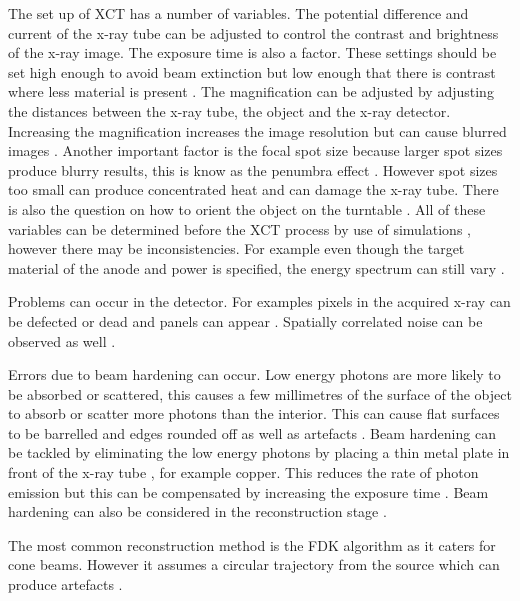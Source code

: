 The set up of XCT has a number of variables. The potential difference and current of the x-ray tube can be adjusted to control the contrast and brightness of the x-ray image. The exposure time is also a factor. These settings should be set high enough to avoid beam extinction but low enough that there is contrast where less material is present \citep{kruth2011computed}. The magnification can be adjusted by adjusting the distances between the x-ray tube, the object and the x-ray detector. Increasing the magnification increases the image resolution but can cause blurred images \citep{kruth2011computed}. Another important factor is the focal spot size because larger spot sizes produce blurry results, this is know as the penumbra effect \citep{kueh2016modelling}. However spot sizes too small can produce concentrated heat \citep{welkenhuyzen2009industrial} and can damage the x-ray tube. There is also the question on how to orient the object on the turntable \citep{corcoran2016observations}. All of these variables can be determined before the XCT process by use of simulations \citep{reisinger2011simulation, reiter2011simulation}, however there may be inconsistencies. For example even though the target material of the anode and power is specified, the energy spectrum can still vary \citep{stumbo2004direct}.

Problems can occur in the detector. For examples pixels in the acquired x-ray can be defected or dead \citep{brettschneider2014spatial} and panels can appear \citep{yang2009evaluation}. Spatially correlated noise can be observed as well \citep{sun2016characterisation}.

Errors due to beam hardening can occur. Low energy photons are more likely to be absorbed or scattered, this causes a few millimetres of the surface of the object to absorb or scatter more photons than the interior. This can cause flat surfaces to be barrelled and edges rounded off \citep{kruth2011computed} as well as artefacts \citep{sun2016applications}. Beam hardening can be tackled by eliminating the low energy photons by placing a thin metal plate in front of the x-ray tube \citep{welkenhuyzen2009industrial}, for example copper. This reduces the rate of photon emission but this can be compensated by increasing the exposure time \citep{kruth2011computed}. Beam hardening can also be considered in the reconstruction stage \citep{sun2016applications}.

The most common reconstruction method is the FDK \citep{feldkamp1984practical} algorithm as it caters for cone beams. However it assumes a circular trajectory from the source which can produce artefacts \citep{sun2016applications}.

